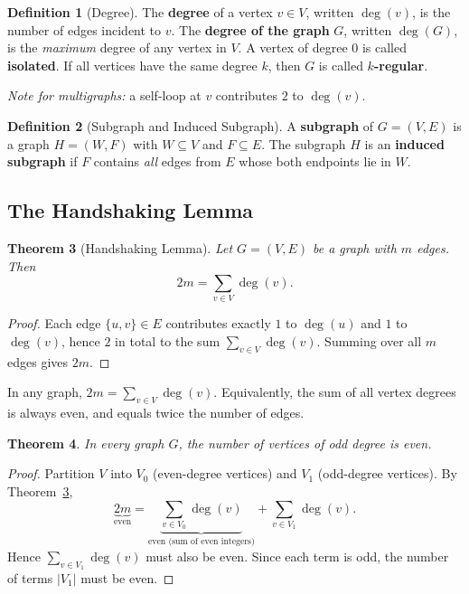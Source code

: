 \documentclass[11pt, a4paper, notitlepage]{report}
\newtheorem{theorem}{Theorem}[section]
\theoremstyle{definition}
\newtheorem{definition}[theorem]{Definition}
\theoremstyle{remark}
\begin{document}
\begin{definition}[Degree]
\label{def:degree}
The \textbf{degree} of a vertex $v \in V$, written $\deg(v)$, is the number of edges
incident to $v$. The \textbf{degree of the graph} $G$, written $\deg(G)$, is the
\emph{maximum} degree of any vertex in $V$. A vertex of degree $0$ is called
\textbf{isolated}. If all vertices have the same degree $k$, then $G$ is called
\textbf{$k$-regular}.

\textit{Note for multigraphs:} a self-loop at $v$ contributes $2$ to $\deg(v)$.
\end{definition}

\begin{definition}[Subgraph and Induced Subgraph]
\label{def:subgraph}
A \textbf{subgraph} of $G = (V,E)$ is a graph $H = (W, F)$ with $W \subseteq V$ and
$F \subseteq E$. The subgraph $H$ is an \textbf{induced subgraph} if $F$ contains
\emph{all} edges from $E$ whose both endpoints lie in $W$.
\end{definition}

\subsection{The Handshaking Lemma}
\label{subsec:handshaking}

\begin{theorem}[Handshaking Lemma]
\label{thm:handshaking}
Let $G = (V, E)$ be a graph with $m$ edges. Then
\[
  2m = \sum_{v \in V} \deg(v).
\]
\end{theorem}

\begin{proof}
Each edge $\{u,v\} \in E$ contributes exactly $1$ to $\deg(u)$ and $1$ to $\deg(v)$, hence
$2$ in total to the sum $\sum_{v \in V} \deg(v)$. Summing over all $m$ edges gives $2m$.
\end{proof}

\begin{keyresult}[title={Key Result: Handshaking Lemma}]
  In any graph, $2m = \sum_{v \in V} \deg(v)$. Equivalently, the sum of all vertex degrees
  is always even, and equals twice the number of edges.
\end{keyresult}

\begin{theorem}
\label{thm:even-odd-degree}
In every graph $G$, the number of vertices of odd degree is even.
\end{theorem}

\begin{proof}
Partition $V$ into $V_0$ (even-degree vertices) and $V_1$ (odd-degree vertices). By
Theorem~\ref{thm:handshaking},
\[
  \underbrace{2m}_{\text{even}}
  = \underbrace{\sum_{v \in V_0} \deg(v)}_{\text{even (sum of even integers)}}
  + \sum_{v \in V_1} \deg(v).
\]
Hence $\sum_{v \in V_1} \deg(v)$ must also be even. Since each term is odd, the number of
terms $|V_1|$ must be even.
\end{proof}
\end{document}
